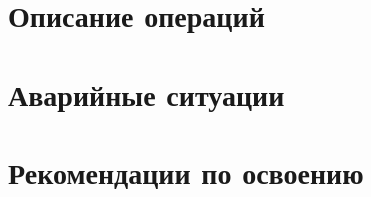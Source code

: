 \subsection{}
\subsection{}

\section{Описание операций}
\subsection{}
\subsection{}

\section{Аварийные ситуации}

\section{Рекомендации по освоению}





